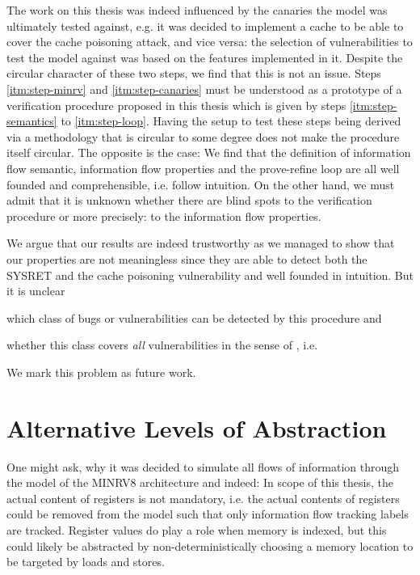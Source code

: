 The work on this thesis was indeed influenced by the canaries the model was ultimately tested against, e.g. it was decided to implement a cache to be able to cover the cache poisoning attack, and vice versa: the selection of vulnerabilities to test the model against was based on the features implemented in it.
Despite the circular character of these two steps, we find that this is not an issue.
Steps \ref{itm:step-minrv} and \ref{itm:step-canaries} must be understood as a prototype of a verification procedure proposed in this thesis which is given by steps \ref{itm:step-semantics} to \ref{itm:step-loop}.
Having the setup to test these steps being derived via a methodology that is circular to some degree does not make the procedure itself circular.
The opposite is the case:
We find that the definition of information flow semantic, information flow properties and the prove-refine loop are all well founded and comprehensible, i.e. follow intuition.
On the other hand, we must admit that it is unknown whether there are blind spots to the verification procedure or more precisely: to the information flow properties.

We argue that our results are indeed trustworthy as we managed to show that our properties are not meaningless since they are able to detect both the SYSRET and the cache poisoning vulnerability and well founded in intuition.
But it is unclear
\begin{enumerate*}[label=\alph*)]
    \item which class of bugs or vulnerabilities can be detected by this procedure and
    \item whether this class covers \textit{all} vulnerabilities in the sense of \citeauthor{Piano}, i.e. 
\end{enumerate*}
We mark this problem as future work.

\section{Alternative Levels of Abstraction}

One might ask, why it was decided to simulate all flows of information through the model of the MINRV8 architecture and indeed: In scope of this thesis, the actual content of registers is not mandatory, i.e. the actual contents of registers could be removed from the model such that only information flow tracking labels are tracked.
Register values do play a role when memory is indexed, but this could likely be abstracted by non-deterministically choosing a memory location to be targeted by loads and stores.

